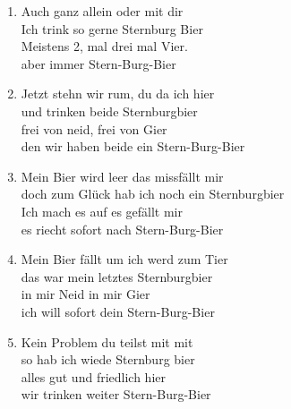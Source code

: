 \begin{guitarMagic}
\begin{enumerate}
        \item Auch ganz allein oder mit dir\\
            Ich trink so gerne Sternburg Bier\\
            Meistens 2, mal drei mal Vier.\\
            aber immer Stern-Burg-Bier\\
            \liedweiter{}
        \item Jetzt stehn wir rum, du da ich hier\\
            und trinken beide Sternburgbier\\
            frei von neid, frei von Gier\\
            den wir haben beide ein Stern-Burg-Bier\\
        \item Mein Bier wird leer das missfällt mir\\
            doch zum Glück hab ich noch ein Sternburgbier\\
            Ich mach es auf es gefällt mir\\
            es riecht sofort nach Stern-Burg-Bier\\
        \item Mein Bier fällt um ich werd zum Tier\\
            das war mein letztes Sternburgbier\\
            in mir Neid in mir Gier\\
            ich will sofort dein Stern-Burg-Bier\\
        \item Kein Problem du teilst mit mit\\
            so hab ich wiede Sternburg bier\\
            alles gut und friedlich hier\\
            wir trinken weiter Stern-Burg-Bier\\



    \end{enumerate}
\end{guitarMagic}
